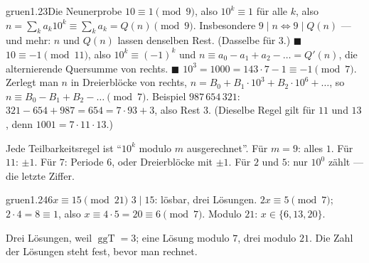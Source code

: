 \begin{loesungkarte}{gruen}{1.23}{Die Neunerprobe}
$10\equiv1\pmod9$, also $10^{k}\equiv1$ für alle $k$, also $n = \sum_ka_k10^{k}\equiv\sum_ka_k = Q(n)\pmod9$. Insbesondere $9\mid n\iff9\mid Q(n)$ --- und mehr: $n$ und $Q(n)$ lassen denselben Rest. (Dasselbe für $3$.) $\blacksquare$
$10\equiv-1\pmod{11}$, also $10^{k}\equiv(-1)^{k}$ und $n\equiv a_0 - a_1 + a_2 - \dots = Q'(n)$, die alternierende Quersumme von rechts. $\blacksquare$
$10^{3} = 1000 = 143\cdot7 - 1\equiv-1\pmod7$. Zerlegt man $n$ in Dreierblöcke von rechts, $n = B_0 + B_1\cdot10^{3} + B_2\cdot10^{6} + \dots$, so $n\equiv B_0 - B_1 + B_2 - \dots\pmod7$. Beispiel $987\,654\,321$: $321 - 654 + 987 = 654 = 7\cdot93 + 3$, also Rest $3$. (Dieselbe Regel gilt für $11$ und $13$, denn $1001 = 7\cdot11\cdot13$.)
\begin{mitnehmen}\kastentext
Jede Teilbarkeitsregel ist \enquote{$10^{k}$ modulo $m$ ausgerechnet}. Für $m = 9$: alles $1$. Für $11$: $\pm1$. Für $7$: Periode $6$, oder Dreierblöcke mit $\pm1$. Für $2$ und $5$: nur $10^{0}$ zählt --- die letzte Ziffer.
\end{mitnehmen}
\end{loesungkarte}

\begin{loesungkarte}{gruen}{1.24}{$6x\equiv15\pmod{21}$}
$3\mid15$: lösbar, drei Lösungen. $2x\equiv5\pmod7$; $2\cdot4 = 8\equiv1$, also $x\equiv4\cdot5 = 20\equiv6\pmod7$. Modulo $21$: $x\in\{6, 13, 20\}$.
\begin{mitnehmen}\kastentext
Drei Lösungen, weil $\operatorname{ggT} = 3$; eine Lösung modulo $7$, drei modulo $21$. Die Zahl der Lösungen steht fest, bevor man rechnet.
\end{mitnehmen}
\end{loesungkarte}

